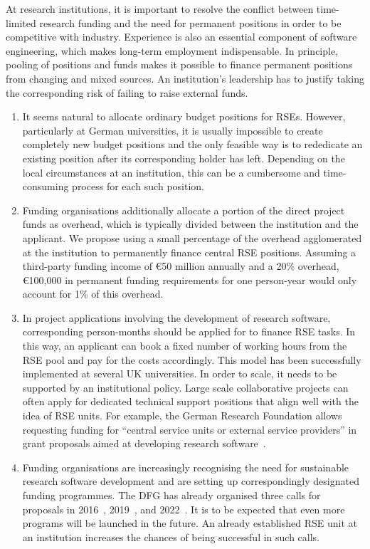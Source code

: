 \documentclass[a4paper]{article}
\begin{document}
At research institutions, it is important to resolve the conflict between time-limited research funding and the need for permanent positions in order to be competitive with industry.
Experience is also an essential component of software engineering, which makes long-term employment indispensable.
In principle, pooling of positions and funds makes it possible to finance permanent positions from changing and mixed sources.
An institution’s leadership has to justify taking the corresponding risk of failing to raise external funds.
\begin{enumerate}
\item It seems natural to allocate ordinary budget positions for RSEs.
      However, particularly at German universities, it is usually impossible to create completely new budget positions and the only feasible way is to rededicate an existing position after its corresponding holder has left.
      Depending on the local circumstances at an institution, this can be a cumbersome and time-consuming process for each such position.
\item Funding organisations additionally allocate a portion of the direct project funds as overhead, which is typically divided between the institution and the applicant.
      We propose using a small percentage of the overhead agglomerated at the institution to permanently finance central RSE positions.
      Assuming a third-party funding income of €50 million annually and a 20\% overhead, €100,000 in permanent funding requirements for one person-year would only account for 1\% of this overhead.
\item In project applications involving the development of research software, corresponding person-months should be applied for to finance RSE tasks.
      In this way, an applicant can book a fixed number of working hours from the RSE pool and pay for the costs accordingly.
      This model has been successfully implemented at several UK universities.
      In order to scale, it needs to be supported by an institutional policy.
      Large scale collaborative projects can often apply for dedicated technical support positions that align well with the idea of RSE units.
      For example, the German Research Foundation allows requesting funding for “central service units or external service providers” in grant proposals aimed at developing research software~\autocite{katerbow_dfg_rse_2024}.
\item Funding organisations are increasingly recognising the need for sustainable research software
      development and are setting up correspondingly designated funding programmes.
      The DFG has already organised three calls for proposals in 2016~\autocite{DFGCall2016NachhaltigkeitFS}, 2019~\autocite{DFGCall2019Qualitaetssicherung}, and 2022~\autocite{DFGCall2022ResearchSoftware,katerbow_dfg_rse_funding_2018}.
      It is to be expected that even more programs will be launched in the future.
      An already established RSE unit at an institution increases the chances of being successful in such calls.
\end{enumerate}
\end{document}
